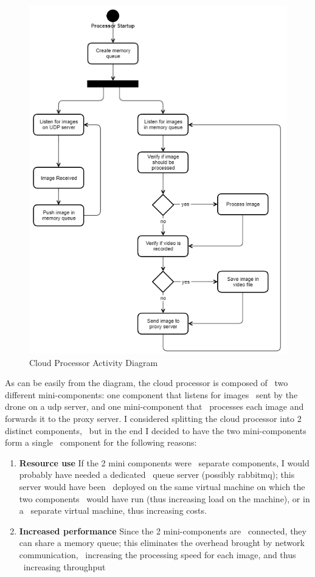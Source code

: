 \begin{figure}[ht]
    \label{fig:cloud-processor-activity-diagram}
    \includegraphics[keepaspectratio]{img/cloud-processor-activity.PNG}
    \caption{Cloud Processor Activity Diagram}
\end{figure}

As can be easily from the diagram, the cloud processor is composed of \
two different mini-components: one component that listens for images \
sent by the drone on a udp server, and one mini-component that \
processes each image and forwards it to the proxy server.
I considered splitting the cloud processor into 2 distinct components, \
but in the end I decided to have the two mini-components form a single \
component for the following reasons:
\begin{enumerate}
    \item \textbf{Resource use} If the 2 mini components were \
            separate components, I would probably have needed a dedicated \
            queue server (possibly rabbitmq); this server would have been \
            deployed on the same virtual machine on which the two components \
            would have run (thus increasing load on the machine), or in a \
            separate virtual machine, thus increasing costs.
    \item \textbf{Increased performance} Since the 2 mini-components are \
            connected, they can share a memory queue;
            this eliminates the overhead brought by network communication, \
            increasing the processing speed for each image, and thus \
            increasing throughput
\end{enumerate}

